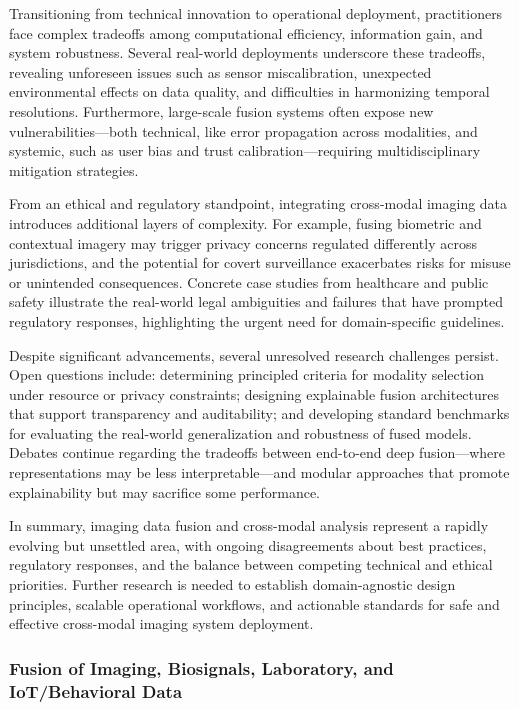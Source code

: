 \documentclass[sigconf]{acmart}
\begin{document}
Transitioning from technical innovation to operational deployment, practitioners face complex tradeoffs among computational efficiency, information gain, and system robustness. Several real-world deployments underscore these tradeoffs, revealing unforeseen issues such as sensor miscalibration, unexpected environmental effects on data quality, and difficulties in harmonizing temporal resolutions. Furthermore, large-scale fusion systems often expose new vulnerabilities—both technical, like error propagation across modalities, and systemic, such as user bias and trust calibration—requiring multidisciplinary mitigation strategies.

From an ethical and regulatory standpoint, integrating cross-modal imaging data introduces additional layers of complexity. For example, fusing biometric and contextual imagery may trigger privacy concerns regulated differently across jurisdictions, and the potential for covert surveillance exacerbates risks for misuse or unintended consequences. Concrete case studies from healthcare and public safety illustrate the real-world legal ambiguities and failures that have prompted regulatory responses, highlighting the urgent need for domain-specific guidelines.

Despite significant advancements, several unresolved research challenges persist. Open questions include: determining principled criteria for modality selection under resource or privacy constraints; designing explainable fusion architectures that support transparency and auditability; and developing standard benchmarks for evaluating the real-world generalization and robustness of fused models. Debates continue regarding the tradeoffs between end-to-end deep fusion—where representations may be less interpretable—and modular approaches that promote explainability but may sacrifice some performance.

In summary, imaging data fusion and cross-modal analysis represent a rapidly evolving but unsettled area, with ongoing disagreements about best practices, regulatory responses, and the balance between competing technical and ethical priorities. Further research is needed to establish domain-agnostic design principles, scalable operational workflows, and actionable standards for safe and effective cross-modal imaging system deployment.

\subsubsection{Fusion of Imaging, Biosignals, Laboratory, and IoT/Behavioral Data}
\end{document}

